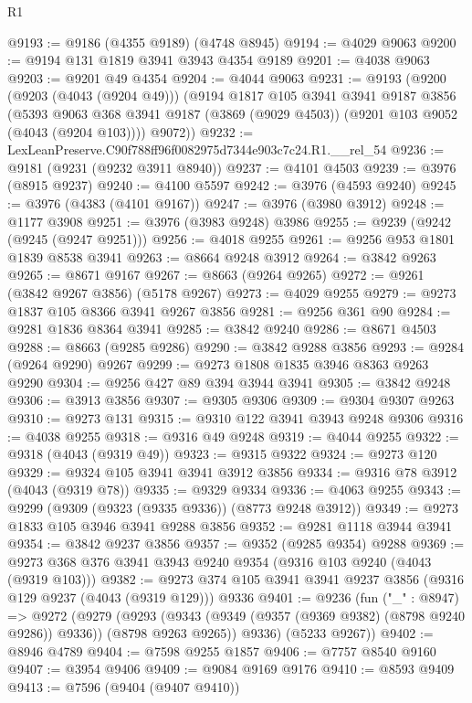 \begin{lexlean}{R1}
\begin{coremodule}
@9193 := @9186 (@4355 @9189) (@4748 @8945)
@9194 := @4029 @9063
@9200 := @9194 @131 @1819 @3941 @3943 @4354 @9189
@9201 := @4038 @9063
@9203 := @9201 @49 @4354
@9204 := @4044 @9063
@9231 := @9193
    (@9200
      (@9203 (@4043 (@9204 @49)))
      (@9194
        @1817
        @105
        @3941
        @3941
        @9187
        @3856
        (@5393 @9063 @368 @3941 @9187 (@3869 (@9029 @4503)) (@9201 @103 @9052 (@4043 (@9204 @103))))
        @9072))
@9232 := LexLeanPreserve.C90f788ff96f0082975d7344e903c7c24.R1.__rel_54
@9236 := @9181 (@9231 (@9232 @3911 @8940))
@9237 := @4101 @4503
@9239 := @3976 (@8915 @9237)
@9240 := @4100 @5597
@9242 := @3976 (@4593 @9240)
@9245 := @3976 (@4383 (@4101 @9167))
@9247 := @3976 (@3980 @3912)
@9248 := @1177 @3908
@9251 := @3976 (@3983 @9248) @3986
@9255 := @9239 (@9242 (@9245 (@9247 @9251)))
@9256 := @4018 @9255
@9261 := @9256 @953 @1801 @1839 @8538 @3941
@9263 := @8664 @9248 @3912
@9264 := @3842 @9263
@9265 := @8671 @9167
@9267 := @8663 (@9264 @9265)
@9272 := @9261 (@3842 @9267 @3856) (@5178 @9267)
@9273 := @4029 @9255
@9279 := @9273 @1837 @105 @8366 @3941 @9267 @3856
@9281 := @9256 @361 @90
@9284 := @9281 @1836 @8364 @3941
@9285 := @3842 @9240
@9286 := @8671 @4503
@9288 := @8663 (@9285 @9286)
@9290 := @3842 @9288 @3856
@9293 := @9284 (@9264 @9290) @9267
@9299 := @9273 @1808 @1835 @3946 @8363 @9263 @9290
@9304 := @9256 @427 @89 @394 @3944 @3941
@9305 := @3842 @9248
@9306 := @3913 @3856
@9307 := @9305 @9306
@9309 := @9304 @9307 @9263
@9310 := @9273 @131
@9315 := @9310 @122 @3941 @3943 @9248 @9306
@9316 := @4038 @9255
@9318 := @9316 @49 @9248
@9319 := @4044 @9255
@9322 := @9318 (@4043 (@9319 @49))
@9323 := @9315 @9322
@9324 := @9273 @120
@9329 := @9324 @105 @3941 @3941 @3912 @3856
@9334 := @9316 @78 @3912 (@4043 (@9319 @78))
@9335 := @9329 @9334
@9336 := @4063 @9255
@9343 := @9299 (@9309 (@9323 (@9335 @9336)) (@8773 @9248 @3912))
@9349 := @9273 @1833 @105 @3946 @3941 @9288 @3856
@9352 := @9281 @1118 @3944 @3941
@9354 := @3842 @9237 @3856
@9357 := @9352 (@9285 @9354) @9288
@9369 := @9273 @368 @376 @3941 @3943 @9240 @9354 (@9316 @103 @9240 (@4043 (@9319 @103)))
@9382 := @9273 @374 @105 @3941 @3941 @9237 @3856 (@9316 @129 @9237 (@4043 (@9319 @129))) @9336
@9401 := @9236
    (fun ("_" : @8947) =>
    @9272
      (@9279
        (@9293 (@9343 (@9349 (@9357 (@9369 @9382) (@8798 @9240 @9286)) @9336)) (@8798 @9263 @9265))
        @9336)
      (@5233 @9267))
@9402 := @8946 @4789
@9404 := @7598 @9255 @1857
@9406 := @7757 @8540 @9160
@9407 := @3954 @9406
@9409 := @9084 @9169 @9176
@9410 := @8593 @9409
@9413 := @7596 (@9404 (@9407 @9410))

\end{coremodule}
\end{lexlean}
